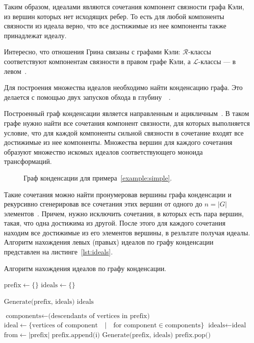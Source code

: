 \documentclass[14pt, russian]{scrartcl}
\begin{document}
Таким образом, идеалами являются сочетания компонент связности графа Кэли, из
вершин которых нет исходящих ребер. То есть для любой компоненты связности из
идеала верно, что все достижимые из нее компоненты также принадлежат идеалу.

Интересно, что отношения Грина связаны с графами Кэли: $\mathcal{R}$-классы
соответствуют компонентам связности в правом графе Кэли, а $\mathcal{L}$-классы
--- в левом~\cite{mathfoundations2025}.

Для построения множества идеалов необходимо найти конденсацию графа. Это
делается с помощью двух запусков обхода в глубину~~\cite{sccs}.

Построенный граф конденсации является направленным и
ацикличным~. В таком графе нужно найти все сочетания
компонент связности, для которых выполняется условие, что для каждой компоненты
сильной связности в сочетание входят все достижимые из нее компоненты. Множества
вершин для каждого сочетания образуют множество искомых идеалов соответствующего
моноида трансформаций.

\begin{figure}[!htb]
  \centering
  \begin{minipage}[t]{\textwidth}
    \centering
    
  \end{minipage}
  \caption{Граф конденсации для примера~\ref{example:simple}.}
  \label{fig:condensation}
\end{figure}

Такие сочетания можно найти пронумеровав вершины графа конденсации и рекурсивно
сгенерировав все сочетания этих вершин от одного до $n = |G|$
элементов~\cite{combobjects}. Причем, нужно исключить сочетания, в которых есть
пара вершин, такая, что одна достижима из другой. После этого для каждого
сочетания находим все достижимые из его элементов вершины, в резльтате получая
идеалы. Алгоритм нахождения левых (правых) идеалов по графу конденсации
представлен на листинге~\ref{lst:ideals}.

\begin{listing}[!htb]
\caption{Алгоритм нахождения идеалов по графу конденсации.}
\label{lst:ideals}
\begin{algorithmic}[1]
    \State $\text{prefix} \gets \{\}$
    \State $\text{ideals} \gets \{\}$

    \State $\text{Generate(prefix, ideals)}$
    \State \Return $\text{ideals}$
\EndProcedure

    \State $\text{components} \gets \text{(descendants of vertices in prefix)}$
    \State $\text{ideal} \gets \{\text{vertices of component}\quad{} | \quad{} \text{for component} \in \text{components}\}$
    \State $\text{ideals} \gets \text{ideal}$
      \State \Return
    \EndIf
    \State $\text{from} \gets |\text{prefix}|$
        \State $\text{prefix.append(i)}$
        \State $\text{Generate(prefix, ideals)}$
        \State $\text{prefix.pop()}$
    \EndFor
\EndFunction
\end{algorithmic}
\end{listing}
\end{document}
